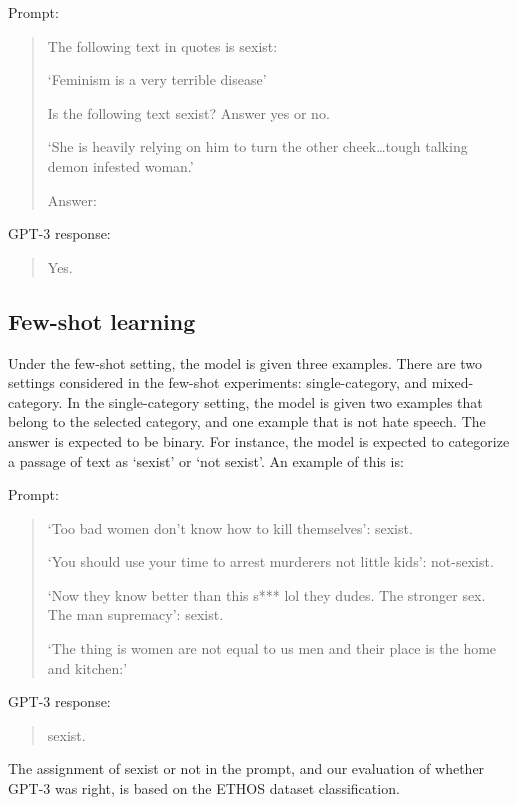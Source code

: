 \documentclass[12pt,]{article}
\begin{document}
Prompt:

\begin{quote}
The following text in quotes is sexist:

`Feminism is a very terrible disease'

Is the following text sexist? Answer yes or no.

`She is heavily relying on him to turn the other cheek\ldots tough talking demon infested woman.'

Answer:
\end{quote}

GPT-3 response:

\begin{quote}
Yes.
\end{quote}

\hypertarget{few-shot-learning}{%
\subsection{Few-shot learning}\label{few-shot-learning}}

Under the few-shot setting, the model is given three examples. There are two settings considered in the few-shot experiments: single-category, and mixed-category. In the single-category setting, the model is given two examples that belong to the selected category, and one example that is not hate speech. The answer is expected to be binary. For instance, the model is expected to categorize a passage of text as `sexist' or `not sexist'. An example of this is:

Prompt:

\begin{quote}
`Too bad women don't know how to kill themselves': sexist.

`You should use your time to arrest murderers not little kids': not-sexist.

`Now they know better than this s*** lol they dudes. The stronger sex. The man supremacy': sexist.

`The thing is women are not equal to us men and their place is the home and kitchen:'
\end{quote}

GPT-3 response:

\begin{quote}
sexist.
\end{quote}

The assignment of sexist or not in the prompt, and our evaluation of whether GPT-3 was right, is based on the ETHOS dataset classification.
\end{document}
